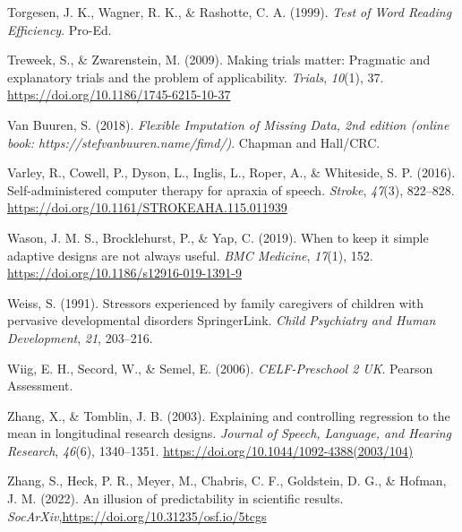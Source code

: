 \documentclass{krantz}
\newlength{\cslhangindent}
\newlength{\cslentryspacingunit} %
\newenvironment{CSLReferences}[2] %
{%
\setlength{\parindent}{0pt}
\ifodd #1
\let\oldpar\par
\def\par{\hangindent=\cslhangindent\oldpar}
\fi
\setlength{\parskip}{#2\cslentryspacingunit}
}%
{}
\begin{document}
\begin{CSLReferences}{1}{0}
\leavevmode{}%
Torgesen, J. K., Wagner, R. K., \& Rashotte, C. A. (1999). \emph{Test of {Word Reading Efficiency}}. {Pro-Ed}.

\leavevmode{}%
Treweek, S., \& Zwarenstein, M. (2009). Making trials matter: Pragmatic and explanatory trials and the problem of applicability. \emph{Trials}, \emph{10}(1), 37. \url{https://doi.org/10.1186/1745-6215-10-37}

\leavevmode{}%
Van Buuren, S. (2018). \emph{Flexible {Imputation} of {Missing Data}, 2nd edition (online book: {https://stefvanbuuren.name/fimd/)}}. {Chapman and Hall/CRC}.

\leavevmode{}%
Varley, R., Cowell, P., Dyson, L., Inglis, L., Roper, A., \& Whiteside, S. P. (2016). Self-administered computer therapy for apraxia of speech. \emph{Stroke}, \emph{47}(3), 822--828. \url{https://doi.org/10.1161/STROKEAHA.115.011939}

\leavevmode{}%
Wason, J. M. S., Brocklehurst, P., \& Yap, C. (2019). When to keep it simple \textendash{} adaptive designs are not always useful. \emph{BMC Medicine}, \emph{17}(1), 152. \url{https://doi.org/10.1186/s12916-019-1391-9}

\leavevmode{}%
Weiss, S. (1991). Stressors experienced by family caregivers of children with pervasive developmental disorders \textbar{} {SpringerLink}. \emph{Child Psychiatry and Human Development}, \emph{21}, 203--216.

\leavevmode{}%
Wiig, E. H., Secord, W., \& Semel, E. (2006). \emph{{CELF-Preschool} 2 {UK}}. {Pearson Assessment}.

\leavevmode{}%
Zhang, X., \& Tomblin, J. B. (2003). Explaining and controlling regression to the mean in longitudinal research designs. \emph{Journal of Speech, Language, and Hearing Research}, \emph{46}(6), 1340--1351. \url{https://doi.org/10.1044/1092-4388(2003/104)}

\leavevmode{}%
Zhang, S., Heck, P. R., Meyer, M., Chabris, C. F., Goldstein, D. G., \& Hofman, J. M. (2022). An illusion of predictability in scientific results. \emph{SocArXiv},\url{https://doi.org/10.31235/osf.io/5tcgs}



\end{CSLReferences}

\printindex
\end{document}
